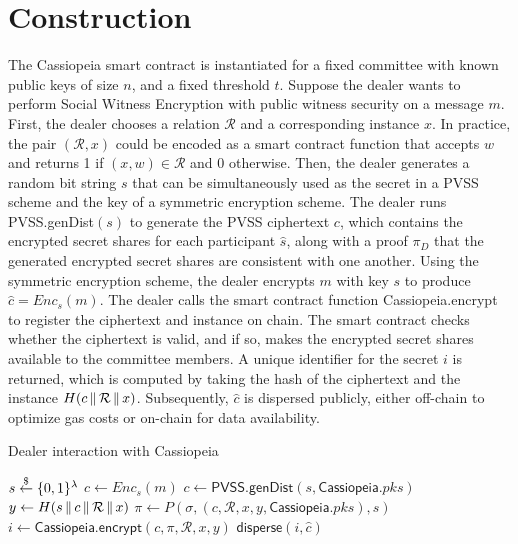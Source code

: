 \section{Construction}\label{construction:without_incentives}
The Cassiopeia smart contract is instantiated for a fixed committee with known public keys of size $n$, and a fixed threshold $t$.
Suppose the dealer wants to perform Social Witness Encryption with public witness security on a message $m$.
First, the dealer chooses a relation $\mathcal{R}$ and a corresponding instance $x$.
In practice, the pair $(\mathcal{R}, x)$ could be encoded as a smart contract function that accepts $w$ and returns 1 if $(x, w) \in \mathcal{R}$ and 0 otherwise.
Then, the dealer generates a random bit string $s$ that can be simultaneously used as the secret in a PVSS scheme and the key of a symmetric encryption scheme. %
The dealer runs \textsf{PVSS.genDist}$(s)$ to generate the PVSS ciphertext $c$, which contains the encrypted secret shares for each participant $\hat{s}$, along with a proof $\pi_D$ that the generated encrypted secret shares are consistent with one another.
Using the symmetric encryption scheme, the dealer encrypts $m$ with key $s$ to produce $\hat{c} = Enc_s(m)$.
The dealer calls the smart contract function \textsf{Cassiopeia.encrypt} to register the ciphertext and instance on chain.
The smart contract checks whether the ciphertext is valid, and if so, makes the encrypted secret shares available to the committee members. 
A unique identifier for the secret $i$ is returned, which is computed by taking the hash of the ciphertext and the instance $H(c \,\|\, \mathcal{R} \,\|\, x)$.
Subsequently, $\hat{c}$ is dispersed publicly, either off-chain to optimize gas costs or on-chain for data availability.

\begin{algorithm}[H]
\caption{Dealer interaction with Cassiopeia}
\label{dealer_alg_no_incentives}
    \begin{algorithmic}[1]
            \State $s \overset{\$}{\gets} \{0,1\}^{\lambda}$
            \State $\hat{c} \gets Enc_s(m)$
            \State $c \gets \textsf{PVSS.genDist}(s, \textsf{Cassiopeia}.pks)$
            \State $y \gets H(s \,\|\, c \,\|\, \mathcal{R} \,\|\, x)$
            \State $\pi \gets P(\sigma, (c, \mathcal{R}, x, y, \textsf{Cassiopeia}.pks), s)$
            \State $i \gets \textsf{Cassiopeia.encrypt}(c, \pi, \mathcal{R}, x, y)$
            \State $\textsf{disperse}(i, \hat{c})$ %
        \EndOn
    \end{algorithmic}
\end{algorithm}

